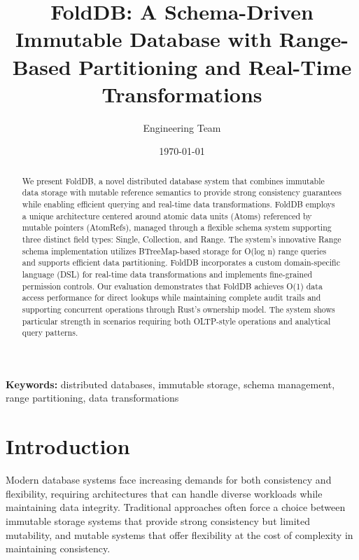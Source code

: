 \documentclass[11pt,a4paper]{article}
\begin{document}
\title{FoldDB: A Schema-Driven Immutable Database with Range-Based Partitioning and Real-Time Transformations}

\author[1]{Engineering Team}

\date{\today}

\maketitle

\begin{abstract}
We present FoldDB, a novel distributed database system that combines immutable data storage with mutable reference semantics to provide strong consistency guarantees while enabling efficient querying and real-time data transformations. FoldDB employs a unique architecture centered around atomic data units (Atoms) referenced by mutable pointers (AtomRefs), managed through a flexible schema system supporting three distinct field types: Single, Collection, and Range. The system's innovative Range schema implementation utilizes BTreeMap-based storage for O(log n) range queries and supports efficient data partitioning. FoldDB incorporates a custom domain-specific language (DSL) for real-time data transformations and implements fine-grained permission controls. Our evaluation demonstrates that FoldDB achieves O(1) data access performance for direct lookups while maintaining complete audit trails and supporting concurrent operations through Rust's ownership model. The system shows particular strength in scenarios requiring both OLTP-style operations and analytical query patterns.
\end{abstract}

\noindent\textbf{Keywords:} distributed databases, immutable storage, schema management, range partitioning, data transformations

\vspace{0.5cm}

\section{Introduction}

Modern database systems face increasing demands for both consistency and flexibility, requiring architectures that can handle diverse workloads while maintaining data integrity. Traditional approaches often force a choice between immutable storage systems that provide strong consistency but limited mutability, and mutable systems that offer flexibility at the cost of complexity in maintaining consistency.
\end{document}
